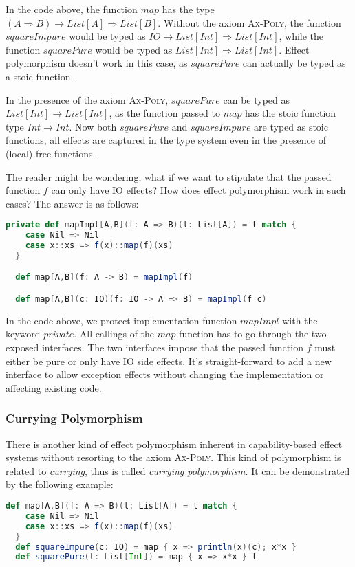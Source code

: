 In the code above, the function $map$ has the type
$(A \Rightarrow B) \to List[A] \Rightarrow List[B]$. Without the axiom
\textsc{Ax-Poly}, the function $squareImpure$ would be typed as
$IO \to List[Int] \Rightarrow List[Int]$, while the function
$squarePure$ would be typed as $List[Int] \Rightarrow List[Int]$.
Effect polymorphism doesn't work in this case, as $squarePure$ can
actually be typed as a stoic function.

In the presence of the axiom \textsc{Ax-Poly}, $squarePure$ can be
typed as $List[Int] \to List[Int]$, as the function passed to $map$
has the stoic function type $Int \to Int$. Now both $squarePure$ and
$squareImpure$ are typed as stoic functions, all effects are captured
in the type system even in the presence of (local) free functions.

The reader might be wondering, what if we want to stipulate that the
passed function $f$ can only have IO effects? How does effect
polymorphism work in such cases? The answer is as follows:

\begin{lstlisting}[language=Scala]
  private def mapImpl[A,B](f: A => B)(l: List[A]) = l match {
    case Nil => Nil
    case x::xs => f(x)::map(f)(xs)
  }

  def map[A,B](f: A -> B) = mapImpl(f)

  def map[A,B](c: IO)(f: IO -> A => B) = mapImpl(f c)
\end{lstlisting}

In the code above, we protect implementation function $mapImpl$ with
the keyword $private$.  All callings of the $map$ function has to go
through the two exposed interfaces. The two interfaces impose that the
passed function $f$ must either be pure or only have IO side
effects. It's straight-forward to add a new interface to allow
exception effects without changing the implementation or affecting
existing code.

\subsubsection{Currying Polymorphism}

There is another kind of effect polymorphism inherent in
capability-based effect systems without resorting to the axiom
\textsc{Ax-Poly}. This kind of polymorphism is related to
\emph{currying}, thus is called \emph{currying polymorphism}. It can
be demonstrated by the following example:

\begin{lstlisting}[language=Scala]
  def map[A,B](f: A => B)(l: List[A]) = l match {
    case Nil => Nil
    case x::xs => f(x)::map(f)(xs)
  }
  def squareImpure(c: IO) = map { x => println(x)(c); x*x }
  def squarePure(l: List[Int]) = map { x => x*x } l
\end{lstlisting}

